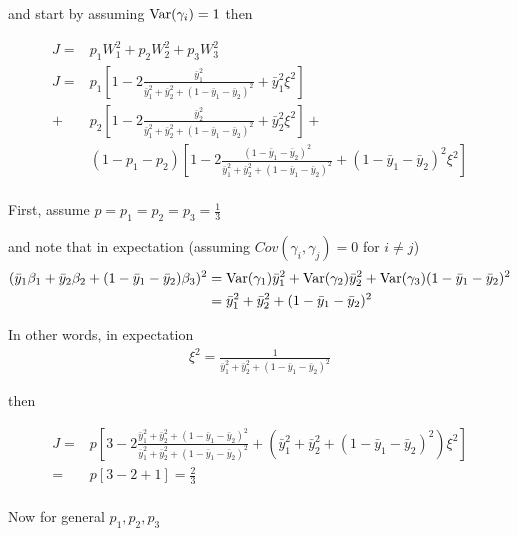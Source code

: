 and start by assuming $\mathrm{Var}(\gamma_i) = 1$ then

\begin{align*}
	J = &p_1 W_1^2 + p_2 W_2^2 + p_3 W_3^2 \\
	J = &p_1[1 - 2 \frac{\bar{y}_1^2}{\bar{y}_1^2 + \bar{y}_2^2 + (1 - \bar{y}_1 - \bar{y}_2 )^2}+ \bar{y}_1^2 \xi^2] \\
	+ &p_2 [1 - 2 \frac{\bar{y}_2^2}{\bar{y}_1^2 + \bar{y}_2^2 + (1 - \bar{y}_1 - \bar{y}_2 )^2}+ \bar{y}_2^2 \xi^2 ] + \\
	  &(1-p_1 - p_2) [1 -2 \frac{(1-\bar{y}_1 - \bar{y}_2)^2}{\bar{y}_1^2 + \bar{y}_2^2 + (1 - \bar{y}_1 - \bar{y}_2 )^2} + (1-\bar{y}_1 - \bar{y}_2)^2 \xi^2] \\
\end{align*}

First, assume $p = p_1 = p_2 = p_3 = \frac{1}{3}$
            
and note that in expectation (assuming $Cov(\gamma_i, \gamma_j) = 0$ for $i \neq j$)
\begin{align*}
	(\bar{y}_1 \beta_1 + \bar{y}_2 \beta_2 + (1 - \bar{y}_1 - \bar{y}_2) \beta_3 )^2 &= \mathrm{Var}(\gamma_1) \bar{y}_1^2 + \mathrm{Var}(\gamma_2) \bar{y}_2^2 + \mathrm{Var}(\gamma_3) (1 - \bar{y}_1 - \bar{y}_2)^2 \\
																					 &=  \bar{y}_1^2 +  \bar{y}_2^2 +  (1 - \bar{y}_1 - \bar{y}_2)^2 \\
\end{align*}

In other words, in expectation
\begin{align*}
	\xi^2 = \frac{1}{\bar{y}_1^2 +  \bar{y}_2^2 +  (1 - \bar{y}_1 - \bar{y}_2)^2}
\end{align*} 

then

\begin{align*}
	J = & p [3 - 2 \frac{\bar{y}_1^2 + \bar{y}_2^2 + (1 - \bar{y}_1 - \bar{y}_2 )^2}{\bar{y}_1^2 + \bar{y}_2^2 + (1 - \bar{y}_1 - \bar{y}_2 )^2} + (\bar{y}_1^2 + \bar{y}_2^2 + (1 - \bar{y}_1 - \bar{y}_2 )^2) \xi^2] \\
	= &p[3 - 2 + 1] = \frac{2}{3} \\
\end{align*} 



Now for general $p_1, p_2, p_3$

